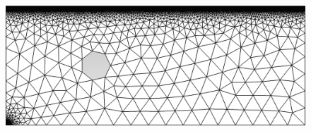 \documentclass[aspectratio=169]{beamer}
\begin{document}
\begin{frame}[fragile]
\begin{columns}
\begin{column}{0.35\textwidth}
\begin{figure}
      \text{~~~}
      \includegraphics[width=1.02\textwidth]{figures/thresholdBW.png}
      \caption{}
      \label{}
    \end{figure}
  \end{column}
\end{columns}
\end{frame}
\end{document}
